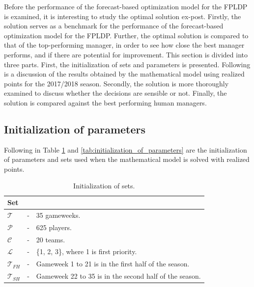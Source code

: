Before the performance of the forecast-based optimization model for the FPLDP is examined, it is interesting to study the optimal solution ex-post. Firstly, the solution serves as a benchmark for the performance of the forecast-based optimization model for the FPLDP. Further, the optimal solution is compared to that of the top-performing manager, in order to see how close the best manager performs, and if there are potential for improvement. This section is divided into three parts. First, the initialization of sets and parameters is presented. Following is a discussion of the results obtained by the mathematical model using realized points for the 2017/2018 season. Secondly, the solution is more thoroughly examined to discuss whether the decisions are sensible or not. Finally, the solution is compared against the best performing human managers. 


\subsection{Initialization of parameters}    

Following in Table \ref{tab:initializations_of_sets} and \ref{tab:initialization_of_parameters} are the initialization of parameters and sets used when the mathematical model is solved with realized points. 

\begin{table}[H]
\centering

\begin{tabular}{@{}lll@{}}
\toprule
Set           &   &                                                               \\ \midrule
$\mathcal{T}$ & - & 35 gameweeks.                                             \\
$\mathcal{P}$ & - & 625 players.                                              \\
$\mathcal{C}$ & - & 20 teams.                                                 \\
$\mathcal{L}$ & - & \{1, 2, 3\}, where 1 is first priority. \\
$\mathcal{T}_{FH}$ & - & Gameweek 1 to 21 is in the first half of the season. \\
$\mathcal{T}_{SH}$ & - & Gameweek 22 to 35 is in the second half of the season. \\
\bottomrule
\end{tabular}
\caption{Initialization of sets.}
\label{tab:initializations_of_sets}
\end{table}

